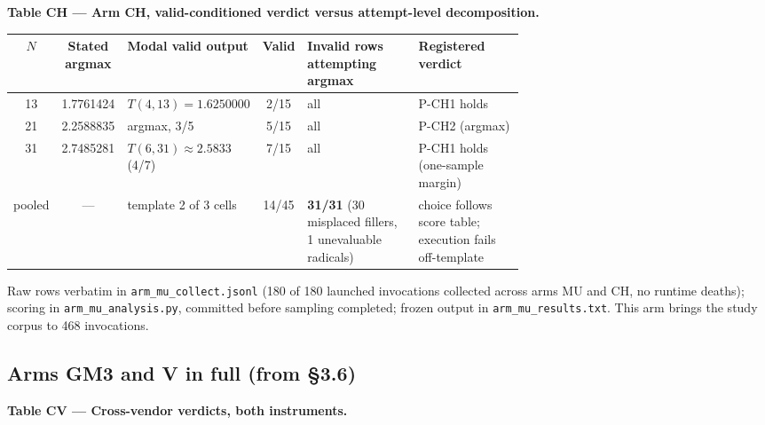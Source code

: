 \textbf{Table CH --- Arm CH, valid-conditioned verdict versus attempt-level decomposition.}

\begin{center}
\begin{small}
\setlength{\tabcolsep}{3.5pt}
\begin{tabular}{@{}ccp{0.24\linewidth}cp{0.22\linewidth}p{0.21\linewidth}@{}}
\toprule
$N$ & Stated argmax & Modal valid output & Valid & Invalid rows attempting argmax & Registered verdict \\
\midrule
13 & 1.7761424 & $T(4,13) = 1.6250000$ & 2/15 & all & P-CH1 holds \\
21 & 2.2588835 & argmax, 3/5 & 5/15 & all & P-CH2 (argmax) \\
31 & 2.7485281 & $T(6,31) \approx 2.5833$ (4/7) & 7/15 & all & P-CH1 holds (one-sample margin) \\
pooled & --- & template 2 of 3 cells & 14/45 & \textbf{31/31} (30 misplaced fillers, 1 unevaluable radicals) & choice follows score table; execution fails off-template \\
\bottomrule
\end{tabular}
\end{small}
\end{center}

Raw rows verbatim in \texttt{arm\_mu\_collect.jsonl} (180 of 180 launched invocations collected across arms MU and CH, no
runtime deaths); scoring in \texttt{arm\_mu\_analysis.py}, committed before sampling completed; frozen
output in \texttt{arm\_mu\_results.txt}. This arm brings the study corpus to 468 invocations.

\subsection{Arms GM3 and V in full (from \S3.6)}

\textbf{Table CV --- Cross-vendor verdicts, both instruments.}

